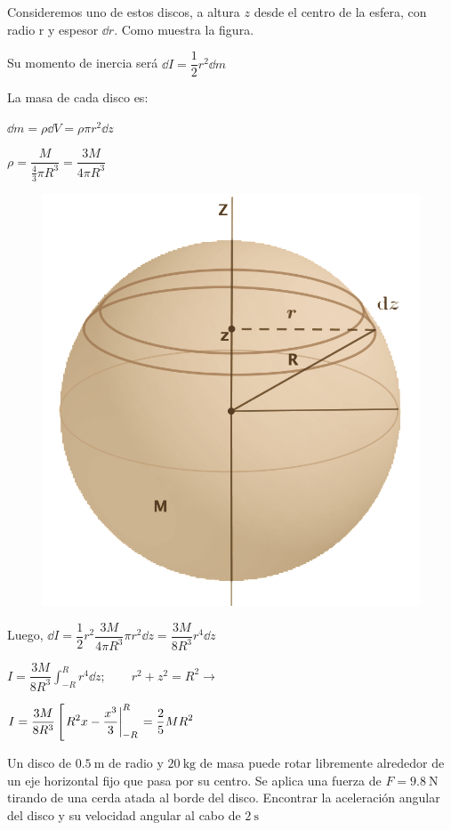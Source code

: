 \vspace{10mm} %

\begin{multicols}{2}
Consideremos uno de estos discos, a altura $z$ desde el centro de la esfera, con radio r y espesor $\dd r$. Como muestra la figura.

Su momento de inercia será $\dd I=\dfrac 1 2 r^2 \dd m$

La masa de cada disco es:
 
$\dd m=\rho \dd V = \rho \pi r^2 \dd z$

$\rho=\dfrac{M}{\frac 4 3 \pi R^3}=\dfrac{3M}{4\pi R^3}$
\begin{figure}[H]
	\centering
	\includegraphics[width=.4\textwidth]{imagenes/imagenes16/T16IM18.png}
\end{figure}
\end{multicols}

Luego, $\dd I=\dfrac 1 2 r^2 \dfrac{3M}{4\pi R^3} \pi r^2 \dd z= \dfrac{3M}{8R^3}r^4 \dd z$

$\displaystyle I= \dfrac{3M}{8R^3} \int_{-R}^{R} r^4 \dd z;\qquad r^2+z^2=R^2 \to $

$\displaystyle I=\dfrac{3M}{8R^3} \left[ \eval{R^2x-\dfrac{x^3}{3}}_{-R}^{R}\right. = \dfrac 2 5 MR^2$

\begin{prob}
Un disco de $0.5\ \mathrm{m}$  de radio y $20\ \mathrm{kg}$ de masa	puede rotar libremente alrededor de un eje horizontal fijo que pasa por su centro. Se aplica una fuerza de $F=9.8\ \mathrm{N}$ tirando de una cerda atada al borde del disco. Encontrar la aceleración angular del disco y su velocidad angular al cabo de $2\ \mathrm{s}$
\end{prob}



